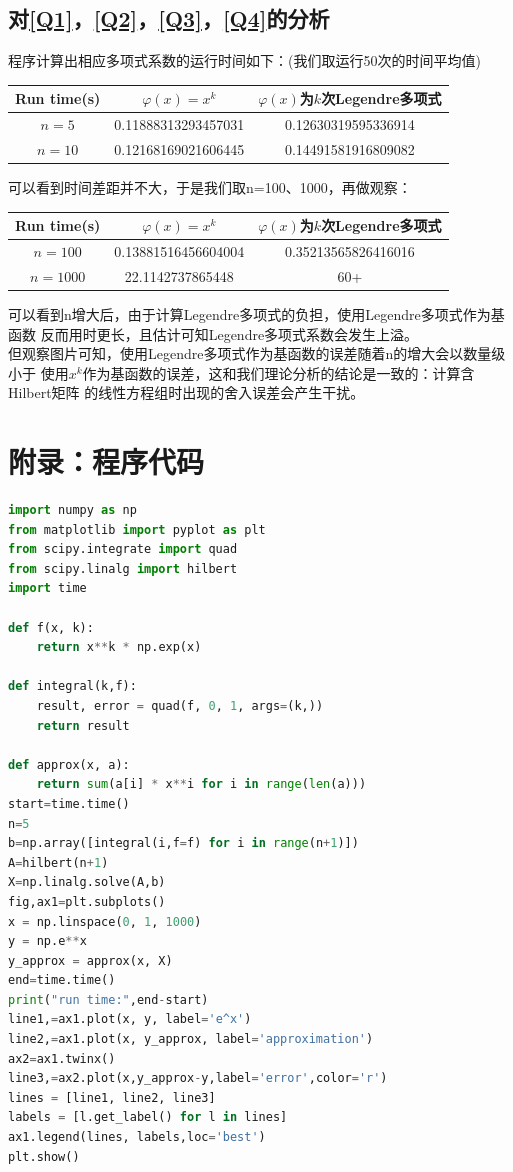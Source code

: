 \documentclass[a4paper,11pt,notitlepage]{article}
\begin{document}
\subsection{对\ref{Q1}，\ref{Q2}，\ref{Q3}，\ref{Q4}的分析}
程序计算出相应多项式系数的运行时间如下：(我们取运行50次的时间平均值)
\begin{center}
\begin{tabular}{|c|c|c|}
\hline
Run time(s)& $\varphi(x)=x^{k}$ & $\varphi(x)$为$k$次Legendre多项式 \\
\hline
$n=5$& 0.11888313293457031 & 0.12630319595336914\\
\hline
$n=10$&0.12168169021606445 & 0.14491581916809082\\
\hline
\end{tabular}
\end{center}
可以看到时间差距并不大，于是我们取n=100、1000，再做观察：
\begin{center}
\begin{tabular}{|c|c|c|}
\hline
Run time(s)& $\varphi(x)=x^{k}$ & $\varphi(x)$为$k$次Legendre多项式 \\
\hline
$n=100$& 0.13881516456604004 & 0.35213565826416016\\
\hline
$n=1000$&22.1142737865448 & 60+\\
\hline
\end{tabular}
\end{center}
可以看到n增大后，由于计算Legendre多项式的负担，使用Legendre多项式作为基函数
反而用时更长，且估计可知Legendre多项式系数会发生上溢。\\
\indent 但观察图片可知，使用Legendre多项式作为基函数的误差随着n的增大会以数量级小于
使用$x^k$作为基函数的误差，这和我们理论分析的结论是一致的：计算含Hilbert矩阵
的线性方程组时出现的舍入误差会产生干扰。

\section{附录：程序代码}
\begin{lstlisting}[language=Python,caption={Seventh Week 1A.py},label={code1}]
import numpy as np
from matplotlib import pyplot as plt
from scipy.integrate import quad
from scipy.linalg import hilbert
import time

def f(x, k):
    return x**k * np.exp(x)

def integral(k,f): 
    result, error = quad(f, 0, 1, args=(k,))
    return result

def approx(x, a):
    return sum(a[i] * x**i for i in range(len(a)))
start=time.time()
n=5
b=np.array([integral(i,f=f) for i in range(n+1)])
A=hilbert(n+1)
X=np.linalg.solve(A,b)
fig,ax1=plt.subplots()
x = np.linspace(0, 1, 1000)
y = np.e**x
y_approx = approx(x, X)
end=time.time()
print("run time:",end-start)
line1,=ax1.plot(x, y, label='e^x')
line2,=ax1.plot(x, y_approx, label='approximation')
ax2=ax1.twinx()
line3,=ax2.plot(x,y_approx-y,label='error',color='r')
lines = [line1, line2, line3]
labels = [l.get_label() for l in lines]
ax1.legend(lines, labels,loc='best')
plt.show()
\end{lstlisting}
\end{document}
